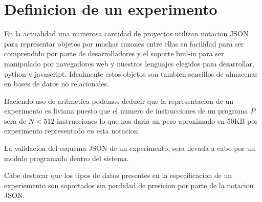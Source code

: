\section{Definicion de un experimento}

En la actualidad una numerosa cantidad de proyectos utilizan notacion JSON para representar
objetos por muchas razones entre ellas su facilidad para ser comprendido por parte de desarrolladores
y el soporte buil-in para ser manipulado por navegadores web y nuestros lenguajes elegidos para
desarrollar, python y javascript. Idealmente estos objetos son tambien sencillos de almacenar en 
bases de datos no relacionales.

Haciendo uso de aritmetica podemos deducir que la representacion de un experimento
es liviana puesto que el numero de instrucciones de un programa \(P\) sera de \(N < 512 \) instrucciones
lo que nos daria un peso aproximado en 50KB por experimento representado en esta notacion.

La validacion del esquema JSON de un experimento, sera llevada a cabo por un modulo programado
dentro del sistema. 

Cabe destacar que los tipos de datos presentes en la especificacion de un experiemento son
soportados sin perdidad de presicion por parte de la notacion JSON.\cite{json_ref}

\newpage

